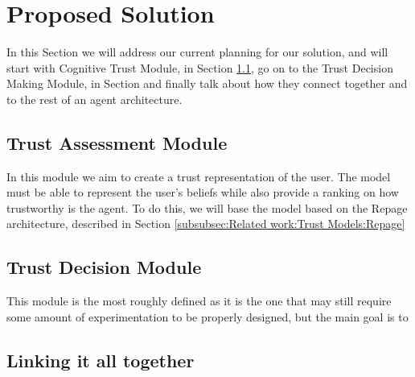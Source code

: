 \section{Proposed Solution}
\label{sec:Solution}
In this Section we will address our current planning for our solution, and will start with Cognitive Trust Module, in Section \ref{subsec:Solution:Trust Assessment Module}, go on to the Trust Decision Making Module, in Section and finally talk about how they connect together and to the rest of an agent architecture.


\subsection{Trust Assessment Module}
\label{subsec:Solution:Trust Assessment Module}
In this module we aim to create a trust representation of the user. The model must be able to represent the user's beliefs while also provide a ranking on how trustworthy is the agent. To do this, we will base the model based on the Repage architecture, described in Section \ref{subsubsec:Related work:Trust Models:Repage}



\subsection{Trust Decision Module}
\label{subsec:Solution:Trust Decision Making Module}
This module is the most roughly defined as it is the one that may still require some amount of experimentation to be properly designed, but the main goal is to 


\subsection{Linking it all together}
\label{subsec:Solution:Linking all together}